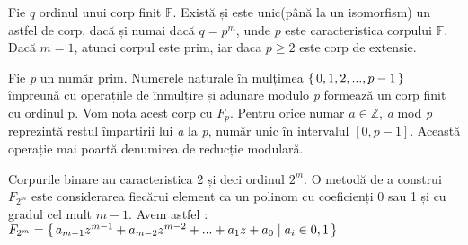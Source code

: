 \begin{teo}
Fie $q$ ordinul unui corp finit $\mathbb{F}$. Există și este unic(până la un isomorfism) un astfel de corp, dacă și numai dacă $q=p^{m}$, unde $p$ este caracteristica corpului $\mathbb{F}$. Dacă $m=1$, atunci corpul este prim, iar daca $p\geq 2$ este corp de extensie.
\end{teo}

\begin{dfn}
Fie \textit{p} un număr prim. Numerele naturale în mulțimea $\set {0, 1, 2, ... , p-1 }$ împreună cu operațiile de înmulțire și adunare modulo \textit{p} formează un corp finit cu ordinul p. Vom nota acest corp cu $F_p$. Pentru orice numar $a\in\mathbb{Z}$, \textit{a} mod \textit{p} reprezintă restul împarțirii lui \textit{a} la \textit{p}, număr unic în intervalul $[0, p-1]$. Această operație mai poartă denumirea de reducție modulară.
\end{dfn}

\begin{dfn}
Corpurile binare au caracteristica 2 și deci ordinul $2^{m}$. O metodă de a construi $F_{2^m}$ este considerarea fiecărui element ca un polinom cu coeficienți 0 sau 1 și cu gradul cel mult $m-1$. Avem astfel : 
 $F_{2^m} = \set {a_{m-1}z^{m-1} + a_{m-2}z^{m-2} + ... + a_{1}z + a_{0}\mid a_{i}\in {0,1}}$
\end{dfn}



